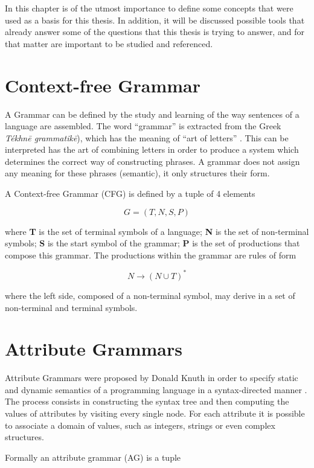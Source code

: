 In this chapter is of the utmost importance to define some concepts that were used as a basis for this thesis. 
In addition, it will be discussed possible tools that already answer some of the questions that this thesis is trying to answer, and for that matter are important to be studied and referenced.


\section{Context-free Grammar}

A Grammar can be defined by the study and learning of the way sentences of a language are assembled.
The word ``grammar'' is extracted from the Greek \emph{Tékhnē grammatikē}), which has the meaning of ``art of letters'' \cite{britannica_2020}.
This can be interpreted has the art of combining letters in order to produce a system which determines the correct way of constructing phrases.
A grammar does not assign any meaning for these phrases (semantic), it only structures their form.

A Context-free Grammar (\textsc{CFG}) is defined by a tuple of 4 elements \cite{henriques_2011}

\[ G = (T, N, S, P) \]

\noindent where \textbf{T} is the set of terminal symbols of a language;
\textbf{N} is the set of non-terminal symbols;
\textbf{S} is the start symbol of the grammar;
\textbf{P} is the set of productions that compose this grammar.
The productions within the grammar are rules of form

\[ N \rightarrow (N \cup T)^* \]

\noindent where the left side, composed of a non-terminal symbol, may derive in a set of non-terminal and terminal symbols.


\section{Attribute Grammars}
Attribute Grammars were proposed by Donald Knuth in order to specify static and dynamic semantics of a programming language in a syntax-directed manner \cite{thirunarayan_2009}. 
The process consists in constructing the syntax tree and then computing the values of attributes by visiting every single node. 
For each attribute it is possible to associate a domain of values, such as integers, strings or even complex structures. 

\noindent Formally an attribute grammar (AG) is a tuple \cite{pereira_2016}


